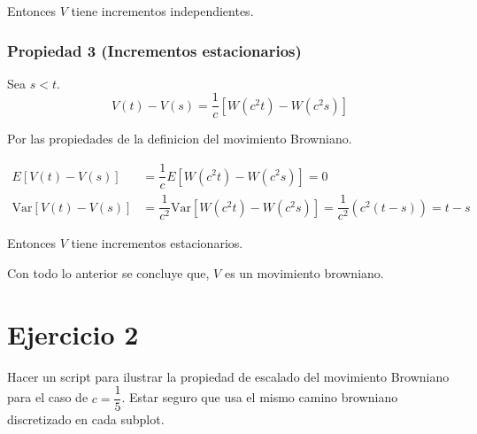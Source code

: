 \documentclass[
  letterpaper,
  DIV=11,
  numbers=noendperiod]{scrreprt}
\theoremstyle{definition}
\theoremstyle{plain}
\theoremstyle{remark}
\begin{document}
Entonces \(V\) tiene incrementos independientes.

\hypertarget{propiedad-3-incrementos-estacionarios}{%
\subsubsection{Propiedad 3 (Incrementos
estacionarios)}\label{propiedad-3-incrementos-estacionarios}}

Sea \(s<t\). \[
V(t)-V(s)=\dfrac{1}{c}\left[W(c^2 t) - W(c^2 s)\right]
\]

Por las propiedades de la definicion del movimiento Browniano.

\begin{align*}
E\left[V(t)-V(s)\right] & =\dfrac{1}{c}E\left[W(c^{2}t)-W(c^{2}s)\right]=0\\
\text{Var}\left[V(t)-V(s)\right] & =\dfrac{1}{c^{2}}\text{Var}\left[W(c^{2}t)-W(c^{2}s)\right]=\dfrac{1}{c^{2}}\left(c^{2}\left(t-s\right)\right)=t-s
\end{align*}

Entonces \(V\) tiene incrementos estacionarios.

Con todo lo anterior se concluye que, \(V\) es un movimiento browniano.

\hypertarget{ejercicio-2-1}{%
\section{Ejercicio 2}\label{ejercicio-2-1}}

Hacer un script para ilustrar la propiedad de escalado del movimiento
Browniano para el caso de \(c = \dfrac{1}{5}\). Estar seguro que usa el
mismo camino browniano discretizado en cada subplot.
\end{document}
